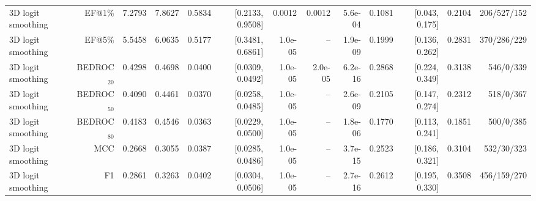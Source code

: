 \begin{table}[t]
\begin{tabular}{lrrrrrrrrrrrr}
3D logit smoothing & EF@1\% & 7.2793 & 7.8627 & 0.5834 & [0.2133, 0.9508] & 0.0012 & 0.0012 & 5.6e-04 & 0.1081 & [0.043, 0.175] & 0.2104 & 206/527/152 \\
3D logit smoothing & EF@5\% & 5.5458 & 6.0635 & 0.5177 & [0.3481, 0.6861] & 1.0e-05 & -- & 1.9e-09 & 0.1999 & [0.136, 0.262] & 0.2831 & 370/286/229 \\
3D logit smoothing & BEDROC$_{20}$ & 0.4298 & 0.4698 & 0.0400 & [0.0309, 0.0492] & 1.0e-05 & 2.0e-05 & 6.2e-16 & 0.2868 & [0.224, 0.349] & 0.3138 & 546/0/339 \\
3D logit smoothing & BEDROC$_{50}$ & 0.4090 & 0.4461 & 0.0370 & [0.0258, 0.0485] & 1.0e-05 & -- & 2.6e-09 & 0.2105 & [0.147, 0.274] & 0.2312 & 518/0/367 \\
3D logit smoothing & BEDROC$_{80}$ & 0.4183 & 0.4546 & 0.0363 & [0.0229, 0.0500] & 1.0e-05 & -- & 1.8e-06 & 0.1770 & [0.113, 0.241] & 0.1851 & 500/0/385 \\
3D logit smoothing & MCC & 0.2668 & 0.3055 & 0.0387 & [0.0285, 0.0486] & 1.0e-05 & -- & 3.7e-15 & 0.2523 & [0.186, 0.321] & 0.3104 & 532/30/323 \\
3D logit smoothing & F1 & 0.2861 & 0.3263 & 0.0402 & [0.0304, 0.0506] & 1.0e-05 & -- & 2.7e-16 & 0.2612 & [0.195, 0.330] & 0.3508 & 456/159/270 \\
\bottomrule
\end{tabular}
\end{table}
